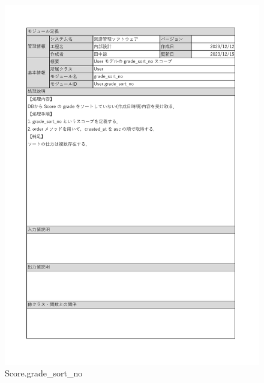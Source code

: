 \begin{figure}
    \centering
    \includegraphics[scale=0.5]{img/Model/gradeSort_no.pdf}
    \caption{Score.grade\_sort\_no}
    \label{Score.grade-sort-no}
\end{figure}
\clearpage

